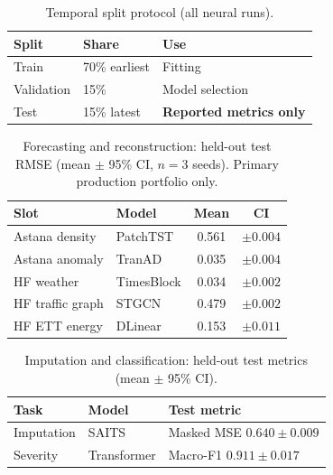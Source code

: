 \begin{table}[H]
  \centering
  \caption{Temporal split protocol (all neural runs).}
  \label{tab:split_protocol}
  \begin{tabular}{@{}lll@{}}
    \toprule
    \textbf{Split} & \textbf{Share} & \textbf{Use} \\
    \midrule
    Train & 70\% earliest & Fitting \\
    Validation & 15\% & Model selection \\
    Test & 15\% latest & \textbf{Reported metrics only} \\
    \bottomrule
  \end{tabular}
\end{table}

\begin{table}[H]
  \centering
  \caption{Forecasting and reconstruction: held-out test RMSE (mean $\pm$ 95\% CI, $n{=}3$ seeds). Primary production portfolio only.}
  \label{tab:multiseed-forecast}
  \small
  \begin{tabular}{@{}llcc@{}}
    \toprule
    \textbf{Slot} & \textbf{Model} & \textbf{Mean} & \textbf{CI} \\
    \midrule
    Astana density & PatchTST & 0.561 & $\pm 0.004$ \\
    Astana anomaly & TranAD & 0.035 & $\pm 0.004$ \\
    HF weather & TimesBlock & 0.034 & $\pm 0.002$ \\
    HF traffic graph & STGCN & 0.479 & $\pm 0.002$ \\
    HF ETT energy & DLinear & 0.153 & $\pm 0.011$ \\
    \bottomrule
  \end{tabular}
\end{table}

\begin{table}[H]
  \centering
  \caption{Imputation and classification: held-out test metrics (mean $\pm$ 95\% CI).}
  \label{tab:multiseed-other}
  \small
  \begin{tabular}{@{}lll@{}}
    \toprule
    \textbf{Task} & \textbf{Model} & \textbf{Test metric} \\
    \midrule
    Imputation & SAITS & Masked MSE $0.640 \pm 0.009$ \\
    Severity & Transformer & Macro-F1 $0.911 \pm 0.017$ \\
    \bottomrule
  \end{tabular}
\end{table}

